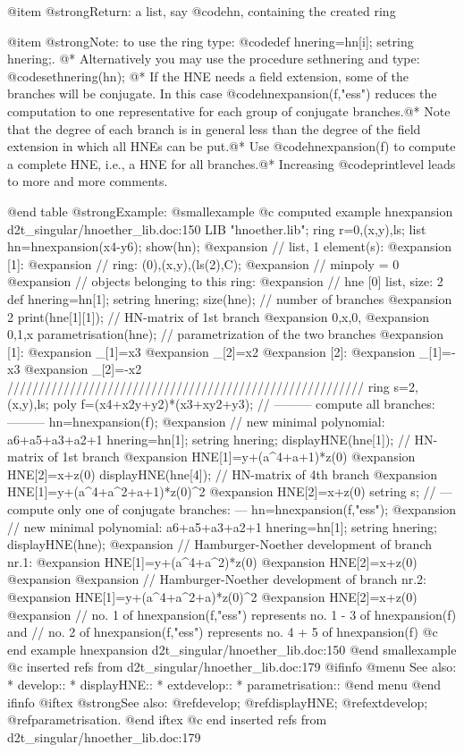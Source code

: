@item @strong{Return:}
a list, say @code{hn}, containing the created ring

@item @strong{Note:}
to use the ring type: @code{def hnering=hn[i]; setring hnering;}.
@*
Alternatively you may use the procedure sethnering and type:
@code{sethnering(hn);}
@*
If the HNE needs a field extension, some of the branches will be
conjugate. In this case @code{hnexpansion(f,"ess")} reduces the
computation to one representative for each group of conjugate
branches.@*
Note that the degree of each branch is in general less than the degree
of the field extension in which all HNEs can be put.@*
Use @code{hnexpansion(f)} to compute a complete HNE, i.e., a HNE for
all branches.@*
Increasing @code{printlevel} leads to more and more comments.

@end table
@strong{Example:}
@smallexample
@c computed example hnexpansion d2t_singular/hnoether_lib.doc:150 
LIB "hnoether.lib";
ring r=0,(x,y),ls;
list hn=hnexpansion(x4-y6);
show(hn);
@expansion{} // list, 1 element(s):
@expansion{} [1]:
@expansion{}    // ring: (0),(x,y),(ls(2),C);
@expansion{}    // minpoly = 0
@expansion{} // objects belonging to this ring:
@expansion{} // hne                  [0]  list, size: 2
def hnering=hn[1];
setring hnering;
size(hne);           // number of branches
@expansion{} 2
print(hne[1][1]);    // HN-matrix of 1st branch
@expansion{} 0,x,0,
@expansion{} 0,1,x 
parametrisation(hne);    // parametrization of the two branches
@expansion{} [1]:
@expansion{}    _[1]=x3
@expansion{}    _[2]=x2
@expansion{} [2]:
@expansion{}    _[1]=-x3
@expansion{}    _[2]=-x2
/////////////////////////////////////////////////////////
ring s=2,(x,y),ls;
poly f=(x4+x2y+y2)*(x3+xy2+y3);
// --------- compute all branches: ---------
hn=hnexpansion(f);
@expansion{} // new minimal polynomial: a6+a5+a3+a2+1
hnering=hn[1];
setring hnering;
displayHNE(hne[1]);   // HN-matrix of 1st branch
@expansion{} HNE[1]=y+(a^4+a+1)*z(0)
@expansion{} HNE[2]=x+z(0)
displayHNE(hne[4]);   // HN-matrix of 4th branch
@expansion{} HNE[1]=y+(a^4+a^2+a+1)*z(0)^2
@expansion{} HNE[2]=x+z(0)
setring s;
// --- compute only one of conjugate branches: ---
hn=hnexpansion(f,"ess");
@expansion{} // new minimal polynomial: a6+a5+a3+a2+1
hnering=hn[1];
setring hnering;
displayHNE(hne);
@expansion{} // Hamburger-Noether development of branch nr.1:
@expansion{} HNE[1]=y+(a^4+a^2)*z(0)
@expansion{} HNE[2]=x+z(0)
@expansion{} 
@expansion{} // Hamburger-Noether development of branch nr.2:
@expansion{} HNE[1]=y+(a^4+a^2+a)*z(0)^2
@expansion{} HNE[2]=x+z(0)
@expansion{} 
// no. 1 of hnexpansion(f,"ess") represents no. 1 - 3 of hnexpansion(f) and
// no. 2 of hnexpansion(f,"ess") represents no. 4 + 5 of hnexpansion(f)
@c end example hnexpansion d2t_singular/hnoether_lib.doc:150
@end smallexample
@c inserted refs from d2t_singular/hnoether_lib.doc:179
@ifinfo
@menu
See also:
* develop::
* displayHNE::
* extdevelop::
* parametrisation::
@end menu
@end ifinfo
@iftex
@strong{See also:}
@ref{develop};
@ref{displayHNE};
@ref{extdevelop};
@ref{parametrisation}.
@end iftex
@c end inserted refs from d2t_singular/hnoether_lib.doc:179

